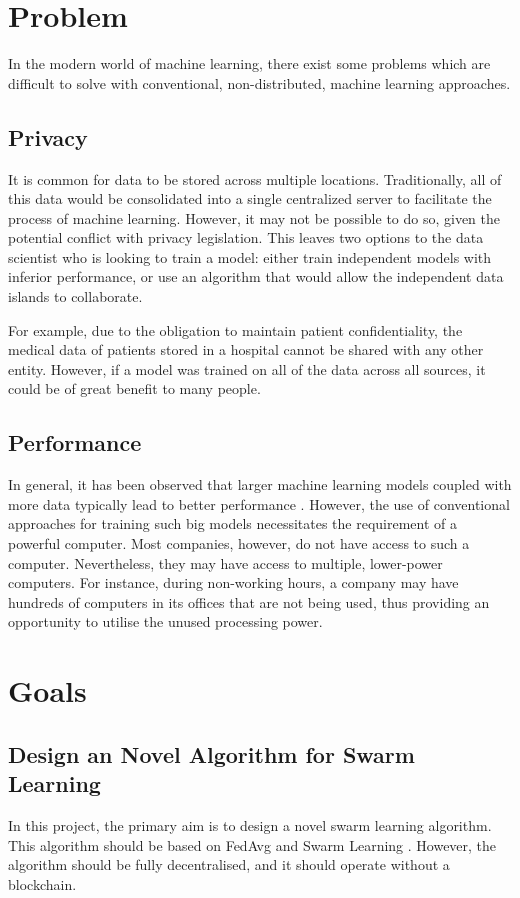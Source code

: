 \section{Problem}
In the modern world of machine learning, there exist some problems which are difficult to solve with conventional, non-distributed, machine learning approaches.

\subsection{Privacy}
It is common for data to be stored across multiple locations. Traditionally, all of this data would be consolidated into a single centralized server to facilitate the process of machine learning. However, it may not be possible to do so, given the potential conflict with privacy legislation. This leaves two options to the data scientist who is looking to train a model: either train independent models with inferior performance, or use an algorithm that would allow the independent data islands to collaborate.

For example, due to the obligation to maintain patient confidentiality, the medical data of patients stored in a hospital cannot be shared with any other entity. However, if a model was trained on all of the data across all sources, it could be of great benefit to many people.

\subsection{Performance}
In general, it has been observed that larger machine learning models coupled with more data typically lead to better performance \citeme. However, the use of conventional approaches for training such big models necessitates the requirement of a powerful computer. Most companies, however, do not have access to such a computer. Nevertheless, they may have access to multiple, lower-power computers. For instance, during non-working hours, a company may have hundreds of computers in its offices that are not being used, thus providing an opportunity to utilise the unused processing power.

\section{Goals}

\subsection{Design an Novel Algorithm for Swarm Learning}
In this project, the primary aim is to design a novel swarm learning algorithm. This algorithm should be based on FedAvg \citeme and Swarm Learning \citeme. However, the algorithm should be fully decentralised, and it should operate without a blockchain.


